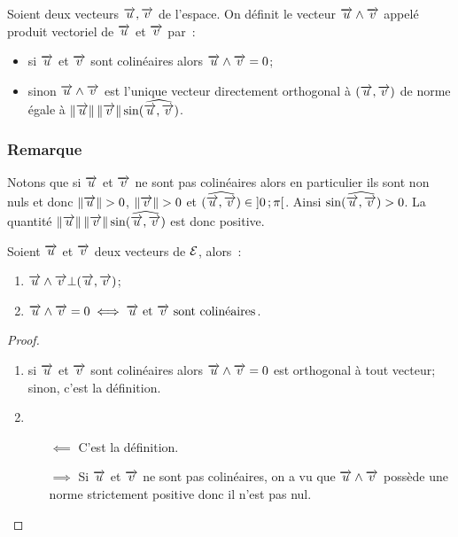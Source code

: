 \begin{defdef}
  Soient deux vecteurs \(\vu, \vv\) de l'espace. On définit le vecteur \(\vu
  \wedge \vv\) appelé produit vectoriel de \(\vu\) et \(\vv\) par~:
  \begin{itemize}
    \item si \(\vu\) et \(\vv\)  sont colinéaires alors \(\vu \wedge \vv =
      0\);
    \item sinon \(\vu \wedge \vv\) est l'unique vecteur directement orthogonal
      à \((\vu, \vv)\) de norme égale à
      \(\norme{\vu}\norme{\vv}\sin(\widehat{\vu, \vv})\).
  \end{itemize}
\end{defdef}

\subsubsection{Remarque}

Notons que si \(\vu\) et \(\vv\) ne sont pas colinéaires alors en particulier
ils sont non nuls et donc \(\norme{\vu}>0\), \(\norme{\vv}>0\) et
\((\widehat{\vu, \vv})\in \intervalleoo{0}{\pi}\). Ainsi \(\sin(\widehat{\vu,
\vv})>0\). La quantité \(\norme{\vu}\norme{\vv}\sin(\widehat{\vu, \vv})\) est
donc positive.

\begin{prop}
  \label{prop:1}
  Soient \(\vu\) et \(\vv\) deux vecteurs de \(\E\), alors~:
  \begin{enumerate}
    \item \(\vu \wedge \vv \bot (\vu, \vv)\);
    \item \(\vu \wedge \vv = 0 \iff \vu \textrm{~et~} \vv \text{~sont
      colinéaires}\).
  \end{enumerate}
\end{prop}

\begin{proof}
  \begin{enumerate}
    \item si \(\vu\) et \(\vv\) sont colinéaires alors \(\vu \wedge \vv = 0\)
      est orthogonal à tout vecteur; sinon, c'est la définition.
    \item
      \begin{itemize}
        \item[\(\impliedby\)] C'est la définition.
        \item[\(\implies\)] Si \(\vu\) et \(\vv\) ne sont pas colinéaires, on
          a vu que \(\vu \wedge \vv\) possède une norme strictement positive
          donc il n'est pas nul.\qedhere
      \end{itemize}
  \end{enumerate}
\end{proof}

